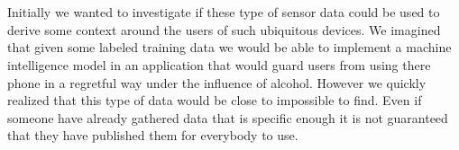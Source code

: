 \\\\
Initially we wanted to investigate if these type of sensor data could be used to derive some context around the users of such ubiquitous devices. We imagined that given some labeled training data we would be able to implement a machine intelligence model in an application that would guard users from using there phone in a regretful way under the influence of alcohol. However we quickly realized that this type of data would be close to impossible to find. Even if someone have already gathered data that is specific enough it is not guaranteed that they have published them for everybody to use.